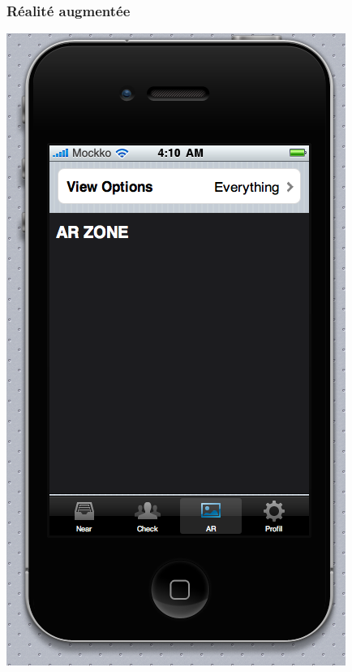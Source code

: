 \documentclass[a4paper,12pt]{report}
\begin{document}
\begin{onehalfspace}
\subsubsection{Réalité augmentée}
\begin{center}
\includegraphics[height=\thehauteurscreen cm]{img/4_ar.png}
\end{center}


\end{onehalfspace}
\end{document}

